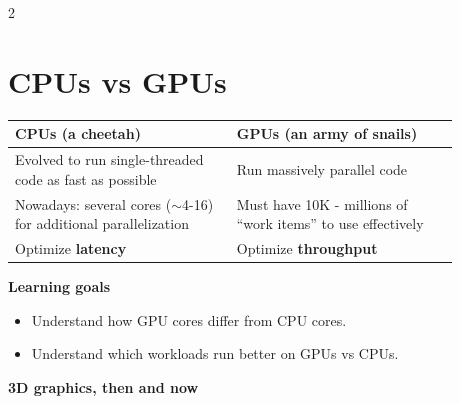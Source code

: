 \documentclass[a4paper,9pt]{extarticle}
\begin{document}

\thispagestyle{fancy}



\raggedcolumns
\begin{multicols}{2}


\section{CPUs vs GPUs}


\begin{summary}

\begin{center}
\begin{tabular}{p{0.44\linewidth}|p{0.44\linewidth}}
\textbf{CPUs} (a cheetah) & \textbf{GPUs} (an army of snails) \\
\hline
Evolved to run single-threaded code as fast as possible &
Run massively parallel code \\
Nowadays: several cores ($\sim$4-16) for additional parallelization &
Must have 10K - millions of ``work items'' to use effectively \\
Optimize \textbf{latency} & Optimize \textbf{throughput} \\
\end{tabular}
\end{center}

\end{summary}


\begin{important}

\textbf{Learning goals}

\begin{itemize}

\item Understand how GPU cores differ from CPU cores.

\item Understand which workloads run better on GPUs vs CPUs.

\end{itemize}

\end{important}


\begin{example}

\textbf{3D graphics, then and now}

\begin{itemize}


\end{itemize}
\end{example}
\end{multicols}
\end{document}
